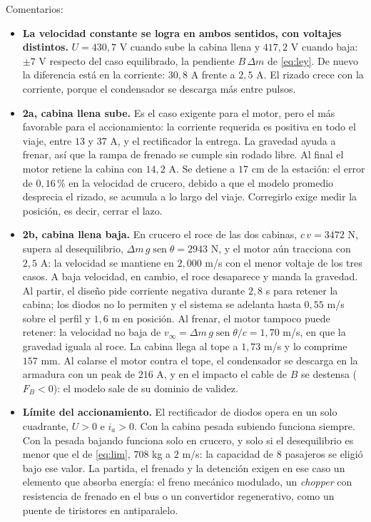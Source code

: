 \documentclass[10pt,a4paper,twocolumn]{article}
\DeclareMathOperator{\sen}{sen}
\begin{document}
\noindent Comentarios:
\begin{itemize}
  \item \textbf{La velocidad constante se logra en ambos sentidos, con voltajes
        distintos.} $U = 430{,}7$ V cuando sube la cabina llena y $417{,}2$ V cuando baja:
        $\pm 7$ V respecto del caso equilibrado, la pendiente $B\,\Delta m$ de
        \eqref{eq:ley}. De nuevo la diferencia está en la corriente: $30{,}8$ A frente a
        $2{,}5$ A. El rizado crece con la corriente, porque el condensador se descarga más
        entre pulsos.
  \item \textbf{2a, cabina llena sube.} Es el caso exigente para el motor, pero el más
        favorable para el accionamiento: la corriente requerida es positiva en todo el
        viaje, entre $13$ y $37$ A, y el rectificador la entrega. La gravedad ayuda a frenar,
        así que la rampa de frenado se cumple sin rodado libre. Al final el motor retiene la
        cabina con $14{,}2$ A. Se detiene a $17$ cm de la estación: el error de $0{,}16$\,\%
        en la velocidad de crucero, debido a que el modelo promedio desprecia el rizado, se
        acumula a lo largo del viaje. Corregirlo exige medir la posición, es decir, cerrar el lazo.
  \item \textbf{2b, cabina llena baja.} En crucero el roce de las dos cabinas,
        $c\,v = 3472$ N, supera al desequilibrio, $\Delta m\, g\sen\theta = 2943$ N, y el
        motor aún tracciona con $2{,}5$ A: la velocidad se mantiene en $2{,}000$ m/s con el
        menor voltaje de los tres casos. A baja velocidad, en cambio, el roce desaparece y
        manda la gravedad. Al partir, el diseño pide corriente negativa durante $2{,}8$ s para
        retener la cabina; los diodos no lo permiten y el sistema se adelanta hasta
        $0{,}55$ m/s sobre el perfil y $1{,}6$ m en posición. Al frenar, el motor tampoco
        puede retener: la velocidad no baja de $v_\infty = \Delta m\, g\sen\theta/c =
        1{,}70$ m/s, en que la gravedad iguala al roce. La cabina llega al tope a
        $1{,}73$ m/s y lo comprime $157$ mm. Al calarse el motor contra el tope, el
        condensador se descarga en la armadura con un peak de $216$ A, y en el impacto el
        cable de $B$ se destensa ($F_B<0$): el modelo sale de su dominio de validez.
  \item \textbf{Límite del accionamiento.} El rectificador de diodos opera en un solo
        cuadrante, $U>0$ e $i_a>0$. Con la cabina pesada subiendo funciona siempre. Con la
        pesada bajando funciona solo en crucero, y solo si el desequilibrio es menor que el
        de \eqref{eq:lim}, $708$ kg a $2$ m/s: la capacidad de 8 pasajeros se eligió bajo
        ese valor. La partida, el frenado y la detención exigen en ese caso un elemento que
        absorba energía: el freno mecánico modulado, un \emph{chopper} con resistencia de
        frenado en el bus o un convertidor regenerativo, como un puente de tiristores en
        antiparalelo.
\end{itemize}
\end{document}

